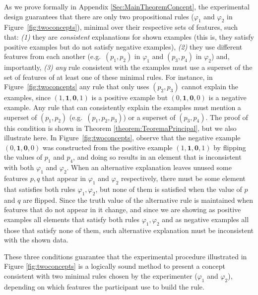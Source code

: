 \begin{enumerate}
  As we prove formally in Appendix \ref{Sec:MainTheoremConcept}, the experimental design guarantees that there are only two %
  propositional rules ($\varphi_1$ and $\varphi_2$ in Figure~\ref{fig:twoconcepts}), minimal over their respective sets of features, such that: \textit{(1)} they are \textit{consistent} explanations for shown examples (this is, they satisfy positive examples but do not satisfy negative examples), \textit{(2)} they use different features from each another (e.g.\ $(p_1, p_2)$ in $\varphi_1$ and $(p_3,p_4)$ in $\varphi_2$)  and, importantly, \textit{(3)} \textit{any} rule consistent with the examples must use a superset of the set of features of at least one of these minimal rules. For instance, in Figure~\ref{fig:twoconcepts} any rule that only uses $(p_2, p_3)$ cannot explain the examples, since $(1,\mathbf{1}, \mathbf{0},1)$ is a positive example but  $(0,\mathbf{1}, \mathbf{0},0)$ is a negative example. Any rule that can consistently explain the examples must mention a superset of $(p_1, p_2)$ (e.g.\  $(p_1, p_2, p_3)$) or a superset of $(p_3, p_4)$. The proof of this condition is shown in Theorem \ref{theorem:TeoremaPrincipal}, but we also illustrate here. In Figure~\ref{fig:twoconcepts}, observe that the negative example $(0,\mathbf{1}, \mathbf{0},0)$ was constructed from the positive example $(1,\mathbf{1}, \mathbf{0},1)$ by flipping the values of $p_1$ and $p_4$, and doing so results in an element that is inconsistent with both $\varphi_1$ and $\varphi_2$. When an alternative explanation leaves unused some features $p,q$ that appear in $\varphi_1$ and $\varphi_2$ respectively, there must be some element that satisfies both rules $\varphi_1,\varphi_2$, but none of them is satisfied when the value of $p$ and $q$ are flipped. Since the truth value of the alternative rule is maintained when features that do not appear in it change, and since we are showing as positive examples all elements that satisfy both rules $\varphi_1,\varphi_2$ and as negative examples all those that satisfy none of them, such alternative explanation must be inconsistent with the shown data.

  These three conditions guarantee that the experimental procedure illustrated in Figure \ref{fig:twoconcepts} is a logically sound method to present a concept consistent with two minimal rules chosen by the experimenter ($\varphi_1$ and $\varphi_2$), depending on which features the participant use to build the rule.
    


\end{enumerate}
